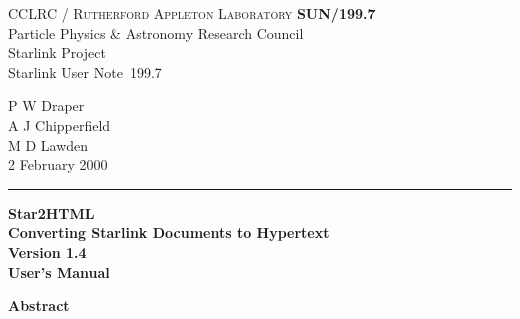 \documentclass[twoside,11pt]{article}
\newcommand{\stardoccategory}  {Starlink User Note}
\newcommand{\stardocinitials}  {SUN}
\newcommand{\stardocnumber}    {199.7}
\newcommand{\stardocauthors}   {P W Draper\\
                                A J Chipperfield\\
                                M D Lawden}
\newcommand{\stardocdate}      {2 February 2000}
\newcommand{\stardoctitle}     {Star2HTML\\[1ex]
                                Converting Starlink Documents to Hypertext}
\newcommand{\stardocversion}   {Version 1.4}
\newcommand{\stardocmanual}    {User's Manual}
\newcommand{\stardocname}{\stardocinitials /\stardocnumber}
\newenvironment{latexonly}{}{}
\renewcommand{\_}{\texttt{\symbol{95}}}
\begin{document}
\thispagestyle{empty}

\begin{latexonly}
   CCLRC / \textsc{Rutherford Appleton Laboratory} \hfill \textbf{\stardocname}\\
   {\large Particle Physics \& Astronomy Research Council}\\
   {\large Starlink Project\\}
   {\large \stardoccategory\ \stardocnumber}
   \begin{flushright}
   \stardocauthors\\
   \stardocdate
   \end{flushright}
   \vspace{-4mm}
   \rule{\textwidth}{0.5mm}
   \vspace{5mm}
   \begin{center}
   {\Huge\textbf{\stardoctitle \\ [2.5ex]}}
   {\LARGE\textbf{\stardocversion \\ [4ex]}}
   {\Huge\textbf{\stardocmanual}}
   \end{center}
   \vspace{5mm}


   \vspace{10mm}
   \begin{center}
      {\Large\textbf{Abstract}}
   \end{center}
\end{latexonly}
\end{document}
